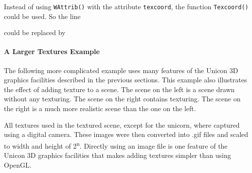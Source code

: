 
Instead of using \texttt{WAttrib()} with the attribute \texttt{texcoord},
the function \texttt{Texcoord()} could be used. So the line 


\noindent
could be replaced by 


\paragraph[A Larger Textures Example]{A Larger Textures Example}
The following more complicated example uses many features of the
Unicon 3D graphics facilities described in the previous sections.
This example also illustrates the effect of adding texture to a scene.
The scene on the left is a scene drawn without any texturing.  The
scene on the right contains texturing. The scene on the right is a
much more realistic scene than the one on the left.

All textures used in the textured scene, except for the unicorn, where
captured using a digital camera. These images were then converted into
.gif files and scaled to width and height of 2\textsuperscript{n}.
Directly using an image file is one feature of the Unicon 3D graphics
facilities that makes adding textures simpler than using OpenGL.

\bigskip

